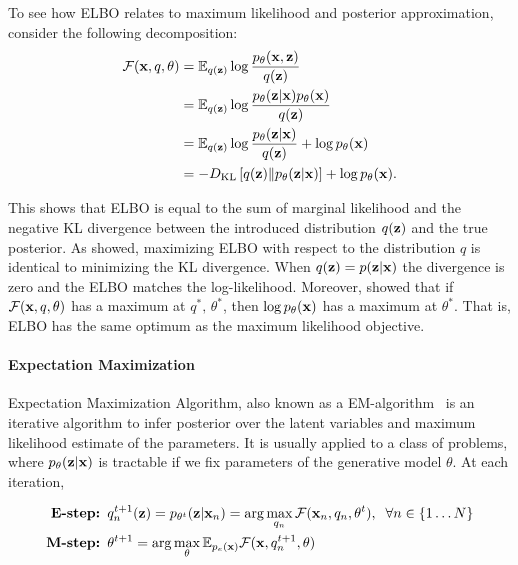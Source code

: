 To see how ELBO relates to maximum likelihood and posterior approximation,  consider the following decomposition:
\begin{equation}
\begin{aligned}
    \mathcal{F}({\mathbf{x}}, q, \theta) &= \mathbb{E}_{q({\mathbf{z}})}\log  \frac{p_{\theta}({\mathbf{x}},{\mathbf{z}})}{q({\mathbf{z}})} \\
    & = \mathbb{E}_{q({\mathbf{z}})}\log  \frac{p_{\theta}({\mathbf{z}}|{\mathbf{x}})p_{\theta}({\mathbf{x}})}{q({\mathbf{z}})} \\
    & = \mathbb{E}_{q({\mathbf{z}})}\log  \frac{p_{\theta}({\mathbf{z}}|{\mathbf{x}})}{q({\mathbf{z}})} +  \log p_{\theta}({\mathbf{x}})\\
    & = - D_{\mathrm{KL}}\left[q({\mathbf{z}})\|p_{\theta}({\mathbf{z}}|{\mathbf{x}})\right] + \log p_{\theta}({\mathbf{x}}).\\
\end{aligned}
\end{equation}

This shows that ELBO is equal to the sum of marginal likelihood and the negative KL divergence between the introduced distribution $q({\mathbf{z}})$ and the true posterior.
As \citet{neal1998view} showed,  maximizing ELBO with respect to the distribution $q$ is identical to minimizing the KL divergence. When $q({\mathbf{z}}) = p({\mathbf{z}}|{\mathbf{x}})$ the divergence is zero and the ELBO matches the log-likelihood.
Moreover, \citet{neal1998view} showed that if $\mathcal{F}({\mathbf{x}}, q, \theta) $ has a maximum at $q^*, \, \theta^*$, then $\log p_{\theta}({\mathbf{x}})$ has a maximum at $\theta^*$. That is, ELBO has the same optimum as the maximum likelihood objective. 

\paragraph{Expectation Maximization}
Expectation Maximization Algorithm, also known as a EM-algorithm~\citep{dempster1977maximum} is an iterative algorithm to infer posterior over the latent variables and maximum likelihood estimate of the parameters.
It is usually applied to a class of problems, where $p_{\theta}({\mathbf{z}}|{\mathbf{x}})$ is tractable if we fix parameters of the generative model $\theta$. At each iteration, 

\begin{equation}
\begin{aligned}
    \text{\textbf{E-step:  }} &q^{t+1}_n({\mathbf{z}}) = p_{\theta^t}({\mathbf{z}}|{\mathbf{x}}_n) = \arg\max_{q_n} \mathcal{F}({\mathbf{x}}_n, q_n, \theta^t),\;\;\forall n \in \{1\dots N\}\\
    \text{\textbf{M-step:  }} &\theta^{t+1} = \arg\max_{\theta} \mathbb{E}_{p_e({\mathbf{x}})}\mathcal{F}({\mathbf{x}}, q^{t+1}_n, \theta)\\
\end{aligned}
\end{equation}

